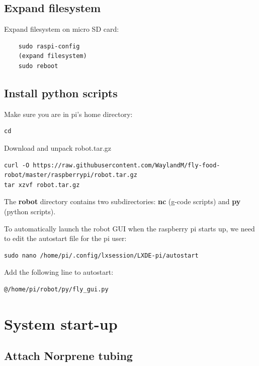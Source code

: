 \documentclass[]{book}
\theoremstyle{definition}
\theoremstyle{definition}
\theoremstyle{remark}
\begin{document}
\section{Expand filesystem}\label{expand-filesystem}

Expand filesystem on micro SD card:

\begin{verbatim}
    sudo raspi-config
    (expand filesystem)
    sudo reboot
\end{verbatim}

\section{Install python scripts}\label{installScripts}

Make sure you are in pi's home directory:

\begin{verbatim}
cd
\end{verbatim}

Download and unpack robot.tar.gz

\begin{verbatim}
curl -O https://raw.githubusercontent.com/WaylandM/fly-food-robot/master/raspberrypi/robot.tar.gz
tar xzvf robot.tar.gz
\end{verbatim}

The \textbf{robot} directory contains two subdirectories: \textbf{nc}
(g-code scripts) and \textbf{py} (python scripts).

To automatically launch the robot GUI when the raspberry pi starts up,
we need to edit the autostart file for the pi user:

\begin{verbatim}
sudo nano /home/pi/.config/lxsession/LXDE-pi/autostart
\end{verbatim}

Add the following line to autostart:

\begin{verbatim}
@/home/pi/robot/py/fly_gui.py
\end{verbatim}

\chapter{System start-up}\label{startup}

\section{Attach Norprene tubing}\label{attach-norprene-tubing}
\end{document}
